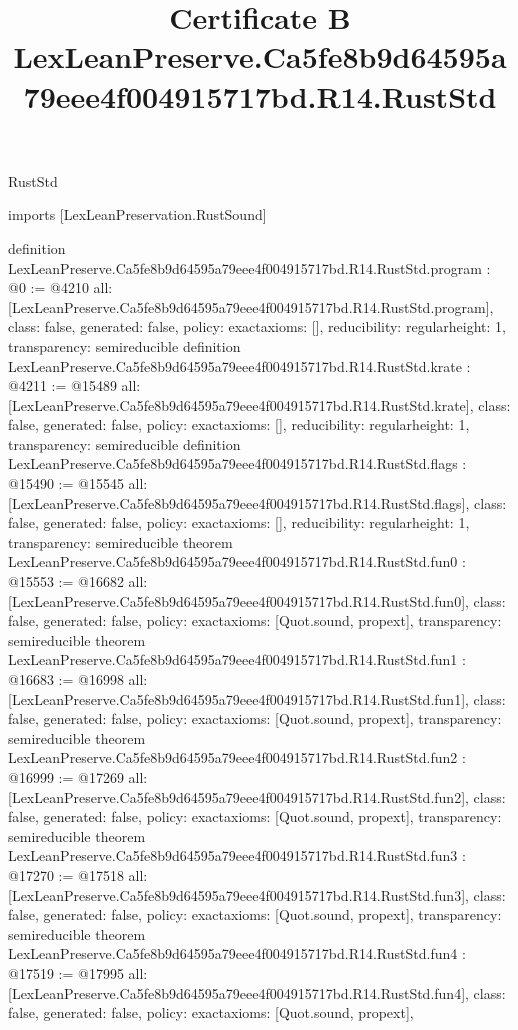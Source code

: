 \begin{lexlean}{RustStd}
\title{Certificate B LexLeanPreserve.Ca5fe8b9d64595a79eee4f004915717bd.R14.RustStd}
\begin{coremodule}
imports [LexLeanPreservation.RustSound]

definition LexLeanPreserve.Ca5fe8b9d64595a79eee4f004915717bd.R14.RustStd.program : @0 := @4210 {
  all: [LexLeanPreserve.Ca5fe8b9d64595a79eee4f004915717bd.R14.RustStd.program],
  class: false,
  generated: false,
  policy: exact{axioms: []},
  reducibility: regular{height: 1},
  transparency: semireducible
}
definition LexLeanPreserve.Ca5fe8b9d64595a79eee4f004915717bd.R14.RustStd.krate : @4211 := @15489 {
  all: [LexLeanPreserve.Ca5fe8b9d64595a79eee4f004915717bd.R14.RustStd.krate],
  class: false,
  generated: false,
  policy: exact{axioms: []},
  reducibility: regular{height: 1},
  transparency: semireducible
}
definition LexLeanPreserve.Ca5fe8b9d64595a79eee4f004915717bd.R14.RustStd.flags : @15490 := @15545 {
  all: [LexLeanPreserve.Ca5fe8b9d64595a79eee4f004915717bd.R14.RustStd.flags],
  class: false,
  generated: false,
  policy: exact{axioms: []},
  reducibility: regular{height: 1},
  transparency: semireducible
}
theorem LexLeanPreserve.Ca5fe8b9d64595a79eee4f004915717bd.R14.RustStd.fun0 : @15553 := @16682 {
  all: [LexLeanPreserve.Ca5fe8b9d64595a79eee4f004915717bd.R14.RustStd.fun0],
  class: false,
  generated: false,
  policy: exact{axioms: [Quot.sound, propext]},
  transparency: semireducible
}
theorem LexLeanPreserve.Ca5fe8b9d64595a79eee4f004915717bd.R14.RustStd.fun1 : @16683 := @16998 {
  all: [LexLeanPreserve.Ca5fe8b9d64595a79eee4f004915717bd.R14.RustStd.fun1],
  class: false,
  generated: false,
  policy: exact{axioms: [Quot.sound, propext]},
  transparency: semireducible
}
theorem LexLeanPreserve.Ca5fe8b9d64595a79eee4f004915717bd.R14.RustStd.fun2 : @16999 := @17269 {
  all: [LexLeanPreserve.Ca5fe8b9d64595a79eee4f004915717bd.R14.RustStd.fun2],
  class: false,
  generated: false,
  policy: exact{axioms: [Quot.sound, propext]},
  transparency: semireducible
}
theorem LexLeanPreserve.Ca5fe8b9d64595a79eee4f004915717bd.R14.RustStd.fun3 : @17270 := @17518 {
  all: [LexLeanPreserve.Ca5fe8b9d64595a79eee4f004915717bd.R14.RustStd.fun3],
  class: false,
  generated: false,
  policy: exact{axioms: [Quot.sound, propext]},
  transparency: semireducible
}
theorem LexLeanPreserve.Ca5fe8b9d64595a79eee4f004915717bd.R14.RustStd.fun4 : @17519 := @17995 {
  all: [LexLeanPreserve.Ca5fe8b9d64595a79eee4f004915717bd.R14.RustStd.fun4],
  class: false,
  generated: false,
  policy: exact{axioms: [Quot.sound, propext]},
}
\end{coremodule}
\end{lexlean}
